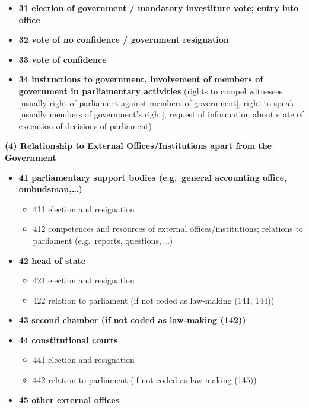 \documentclass[10pt,]{article}
\providecommand{\tightlist}{%
  \setlength{\itemsep}{0pt}\setlength{\parskip}{0pt}}
\begin{document}
\begin{itemize}
\tightlist
\item
  \textbf{31 election of government / mandatory investiture vote; entry
  into office}
\item
  \textbf{32 vote of no confidence / government resignation}
\item
  \textbf{33 vote of confidence}
\item
  \textbf{34 instructions to government, involvement of members of
  government in parliamentary activities} (rights to compel witnesses
  {[}usually right of parliament against members of government{]}, right
  to speak {[}usually members of government's right{]}, request of
  information about state of execution of decisions of parliament)
\end{itemize}

\textbf{(4) Relationship to External Offices/Institutions apart from the
Government}

\begin{itemize}
\tightlist
\item
  \textbf{41 parliamentary support bodies (e.g.~general accounting
  office, ombudsman,\ldots{})}

  \begin{itemize}
  \tightlist
  \item
    411 election and resignation
  \item
    412 competences and resources of external offices/institutions;
    relations to parliament (e.g.~reports, questions, \ldots{})
  \end{itemize}
\item
  \textbf{42 head of state}

  \begin{itemize}
  \tightlist
  \item
    421 election and resignation
  \item
    422 relation to parliament (if not coded as law-making (141, 144))
  \end{itemize}
\item
  \textbf{43 second chamber (if not coded as law-making (142))}
\item
  \textbf{44 constitutional courts}

  \begin{itemize}
  \tightlist
  \item
    441 election and resignation
  \item
    442 relation to parliament (if not coded as law-making (145))
  \end{itemize}
\item
  \textbf{45 other external offices}
\end{itemize}
\end{document}
